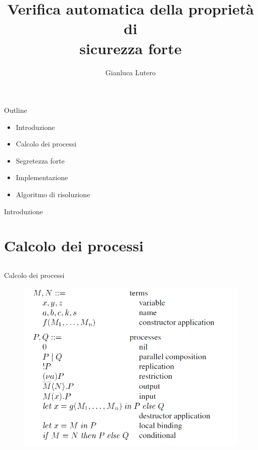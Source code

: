 \documentclass[12pt,xcolor=table]{beamer}
\title{Verifica automatica della proprietà di\\ sicurezza forte}
\author{Gianluca Lutero}
\institute{Alma Mater Studiorum Bologna\\Crittografia}
\date{}
\begin{document}
\begin{frame}{}
    \maketitle
\end{frame}

\begin{frame}{Outline}
    \begin{itemize}
        \item Introduzione
        \item Calcolo dei processi
        \item Segretezza forte
        \item Implementazione
        \item Algoritmo di risoluzione
    \end{itemize}
\end{frame}

\begin{frame}{Introduzione}
    
\end{frame}

\section{Calcolo dei processi}
\subsection{}
\begin{frame}{Calcolo dei processi}
    \begin{figure}[h]
        \centering
        \includegraphics[scale=0.5]{Relazione/Immagini/calcolo.PNG}
    \end{figure}
\end{frame}
\end{document}
